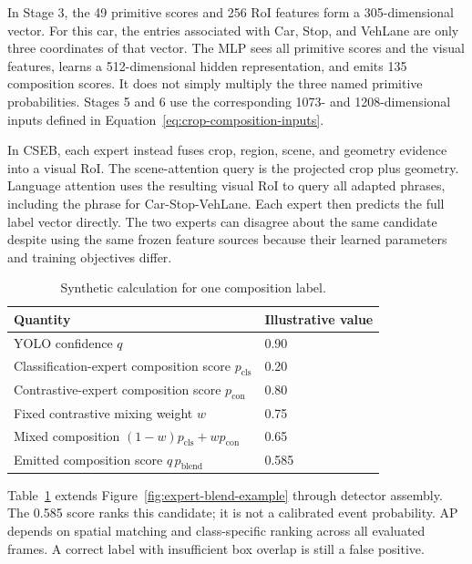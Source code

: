 In Stage 3, the 49 primitive scores and 256 RoI features form a 305-dimensional vector. For this car, the entries associated with Car, Stop, and VehLane are only three coordinates of that vector. The MLP sees all primitive scores and the visual features, learns a 512-dimensional hidden representation, and emits 135 composition scores. It does not simply multiply the three named primitive probabilities. Stages 5 and 6 use the corresponding 1073- and 1208-dimensional inputs defined in Equation~\ref{eq:crop-composition-inputs}.

In CSEB, each expert instead fuses crop, region, scene, and geometry evidence into a visual RoI. The scene-attention query is the projected crop plus geometry. Language attention uses the resulting visual RoI to query all adapted phrases, including the phrase for Car-Stop-VehLane. Each expert then predicts the full label vector directly. The two experts can disagree about the same candidate despite using the same frozen feature sources because their learned parameters and training objectives differ.

\begin{table}[htbp]
\centering
\caption{Synthetic calculation for one composition label.}
\label{tab:worked-score}
\begin{singlespace}
\begin{tabularx}{\textwidth}{@{}Xl@{}}
\toprule
\textbf{Quantity} & \textbf{Illustrative value}\\
\midrule
YOLO confidence \(q\) & 0.90\\
Classification-expert composition score \(p_{\mathrm{cls}}\) & 0.20\\
Contrastive-expert composition score \(p_{\mathrm{con}}\) & 0.80\\
Fixed contrastive mixing weight \(w\) & 0.75\\
Mixed composition \((1-w)p_{\mathrm{cls}}+wp_{\mathrm{con}}\) & 0.65\\
Emitted composition score \(q\,p_{\mathrm{blend}}\) & 0.585\\
\bottomrule
\end{tabularx}
\end{singlespace}
\end{table}

Table~\ref{tab:worked-score} extends Figure~\ref{fig:expert-blend-example} through detector assembly. The 0.585 score ranks this candidate; it is not a calibrated event probability. AP depends on spatial matching and class-specific ranking across all evaluated frames. A correct label with insufficient box overlap is still a false positive.
